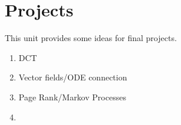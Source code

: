 \chapter{Projects}

This unit provides some ideas for final projects.

\begin{enumerate}
\item DCT
\item Vector fields/ODE connection
\item Page Rank/Markov Processes
\item 
\end{enumerate}


